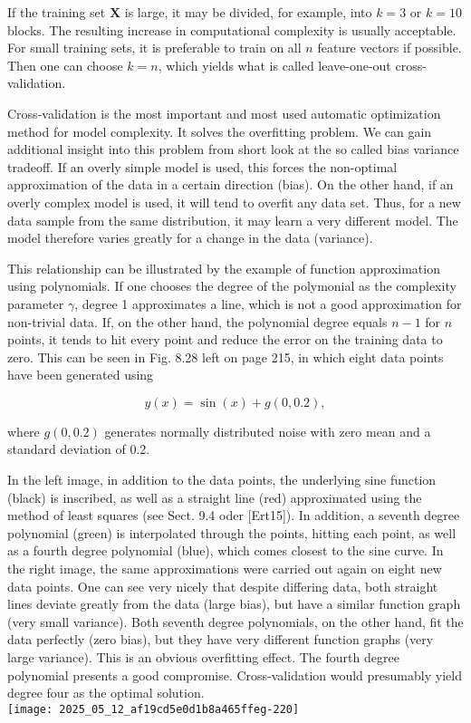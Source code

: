 \documentclass[10pt]{article}
\begin{document}
If the training set $\boldsymbol{X}$ is large, it may be divided, for example, into $k=3$ or $k=10$ blocks. The resulting increase in computational complexity is usually acceptable. For small training sets, it is preferable to train on all $n$ feature vectors if possible. Then one can choose $k=n$, which yields what is called leave-one-out cross-validation.

Cross-validation is the most important and most used automatic optimization method for model complexity. It solves the overfitting problem. We can gain additional insight into this problem from short look at the so called bias variance tradeoff. If an overly simple model is used, this forces the non-optimal approximation of the data in a certain direction (bias). On the other hand, if an overly complex model is used, it will tend to overfit any data set. Thus, for a new data sample from the same distribution, it may learn a very different model. The model therefore varies greatly for a change in the data (variance).

This relationship can be illustrated by the example of function approximation using polynomials. If one chooses the degree of the polymonial as the complexity parameter $\gamma$, degree 1 approximates a line, which is not a good approximation for non-trivial data. If, on the other hand, the polynomial degree equals $n-1$ for $n$ points, it tends to hit every point and reduce the error on the training data to zero. This can be seen in Fig. 8.28 left on page 215, in which eight data points have been generated using

$$
y(x)=\sin (x)+g(0,0.2),
$$

where $g(0,0.2)$ generates normally distributed noise with zero mean and a standard deviation of 0.2.

In the left image, in addition to the data points, the underlying sine function (black) is inscribed, as well as a straight line (red) approximated using the method of least squares (see Sect. 9.4 oder [Ert15]). In addition, a seventh degree polynomial (green) is interpolated through the points, hitting each point, as well as a fourth degree polynomial (blue), which comes closest to the sine curve. In the right image, the same approximations were carried out again on eight new data points. One can see very nicely that despite differing data, both straight lines deviate greatly from the data (large bias), but have a similar function graph (very small variance). Both seventh degree polynomials, on the other hand, fit the data perfectly (zero bias), but they have very different function graphs (very large variance). This is an obvious overfitting effect. The fourth degree polynomial presents a good compromise. Cross-validation would presumably yield degree four as the optimal solution.\\
\texttt{[image: 2025\_05\_12\_af19cd5e0d1b8a465ffeg-220]}
\end{document}
